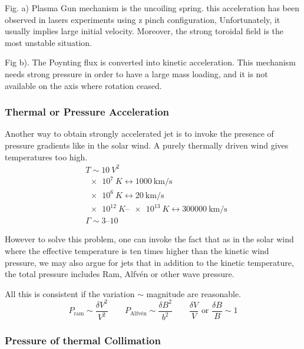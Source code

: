 \documentclass[10pt,a4paper,english]{article}
\begin{document}

Fig. a) Plasma Gun mechanism is the uncoiling spring. this acceleration has
been observed in lasers experiments using z pinch configuration, Unfortunately,
it usually implies large initial velocity. Moreover, the strong toroidal field
is the most unstable situation.

Fig b). The Poynting flux is converted into kinetic acceleration. This
mechanism needs strong pressure in order to have  a large mass loading, and it
is not available on the axis where rotation ceased.

\subsubsection{Thermal or Pressure Acceleration}

Another way to obtain strongly accelerated jet is to invoke the presence of
pressure gradients like in the solar wind. A purely thermally driven wind gives
temperatures too high.
\begin{align*}
    & T \sim \SI{10}{V^2} \\
    & \SI{e7}{K} \leftrightarrow	  \SI{1000}{\km\per \s } \\
    & \SI{e6}{K} \leftrightarrow \SI{20}{\km \per\s}  \\
    &\SIrange{e12}{e13}{K} \leftrightarrow  \SI{300000}{\km \per \s} \\
    & \Gamma \sim \numrange{3}{10}
\end{align*}

However to solve this problem, one can invoke the fact that as in the solar
wind where the effective temperature is ten times higher than the kinetic wind
pressure, we may also argue for jets that in addition to the kinetic
temperature, the total pressure includes Ram, Alfvén or other wave pressure.


All this is consistent if the variation $\sim$ magnitude are reasonable.
\begin{equation}
    P_\mathrm{ram} \sim \frac{\delta V^2}{V^2} \qquad
    P_\textrm{Alfvén}	\sim \frac{\delta B^2}{b^2} \qquad
    \frac{\delta V}{V } \text{ or } \frac{\delta B}{B} \sim 1
\end{equation}

\subsubsection{Pressure of thermal Collimation}
\end{document}
